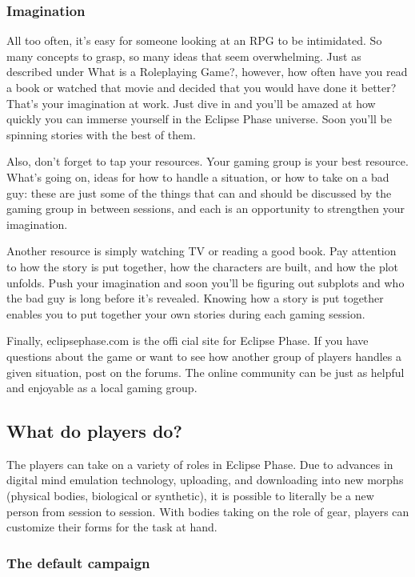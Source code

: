 \subsubsection{Imagination}
\label{sec:imagination}

All too often, it's easy for someone looking at an RPG to be intimidated. So many concepts to grasp, so many ideas that seem overwhelming. Just as described under What is a Roleplaying Game?, however, how often have you read a book or watched that movie and decided that you would have done it better? That's your imagination at work. Just dive in and you'll be amazed at how quickly you can immerse yourself in the Eclipse Phase universe. Soon you'll be spinning stories with the best of them.

Also, don't forget to tap your resources. Your gaming group is your best resource. What's going on, ideas for how to handle a situation, or how to take on a bad guy: these are just some of the things that can and should be discussed by the gaming group in between sessions, and each is an opportunity to strengthen your imagination.

Another resource is simply watching TV or reading a good book. Pay attention to how the story is put together, how the characters are built, and how the plot unfolds. Push your imagination and soon you'll be figuring out subplots and who the bad guy is long before it's revealed. Knowing how a story is put together enables you to put together your own stories during each gaming session.

Finally, eclipsephase.com is the offi cial site for Eclipse Phase. If you have questions about the game or want to see how another group of players handles a given situation, post on the forums. The online community can be just as helpful and enjoyable as a local gaming group.


\subsection{What do players do?}
\label{sec:what-do-players}

The players can take on a variety of roles in Eclipse Phase. Due to advances in digital mind emulation technology, uploading, and downloading into new morphs (physical bodies, biological or synthetic), it is possible to literally be a new person from session to session. With bodies taking on the role of gear, players can customize their forms for the task at hand.


\subsubsection{The default campaign}
\label{sec:default-campaign}

